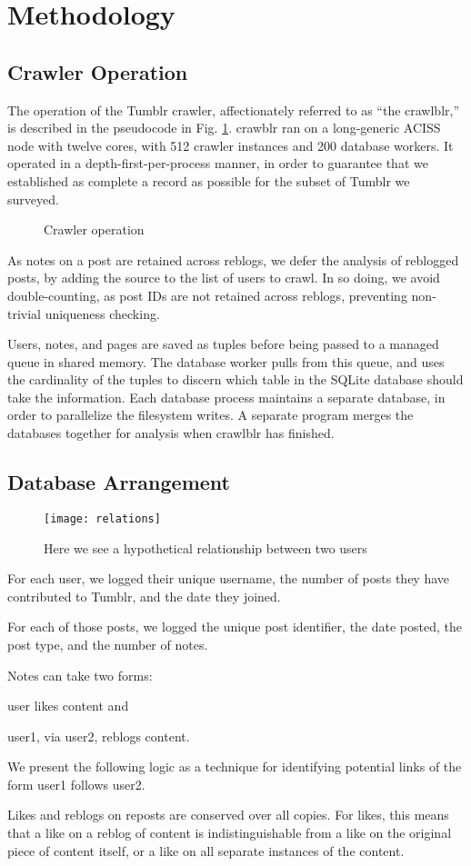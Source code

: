 \section{Methodology}
\label{sec:-method}
\subsection{Crawler Operation}
The operation of the Tumblr crawler, affectionately referred to as ``the crawlblr,'' 
is described in the pseudocode in Fig. \ref{crawler}.  crawblr 
ran on a long-generic ACISS node with twelve cores, with 512 crawler 
instances and 200 database workers.  It operated in a 
depth-first-per-process manner, in order to guarantee that we 
established as complete a record as possible for the subset of Tumblr 
we surveyed. 
\begin{figure}
  
  \caption{Crawler operation}\label{crawler}
\end{figure}

As notes on a post are retained across reblogs, we defer the analysis 
of reblogged posts, by adding the source to the list of users to crawl.  
In so doing, we avoid double-counting, as post IDs are not retained 
across reblogs, preventing non-trivial uniqueness checking.

Users, notes, and pages are saved as tuples before being passed to a 
managed queue in shared memory.  The database worker pulls from this 
queue, and uses the cardinality of the tuples to discern which table 
in the SQLite database should take the information.  Each database 
process maintains a separate database, in order to parallelize the 
filesystem writes.  A separate program merges the databases together 
for analysis when crawlblr has finished.
\subsection{Database Arrangement}
\begin{figure*}
\centering
\texttt{[image: relations]}
 \caption{Here we see a hypothetical relationship between two users}
 \label{fig:relations}
\end{figure*}

For each user, we logged their unique username, the number of posts 
they have contributed to Tumblr, and the date they joined. 

For each of those posts, we logged the unique post identifier, the 
date posted, the post type, and the number of notes.

Notes can take two forms: 

user likes content and 

user1, via user2, reblogs content.

We present the following logic as a technique for identifying potential 
links of the form user1 follows user2.

Likes and reblogs on reposts are conserved over all copies.  For likes, 
this means that a like on a reblog of content is indistinguishable from 
a like on the original piece of content itself, or a like on all 
separate instances of the content.
